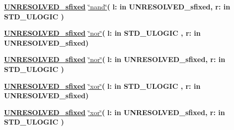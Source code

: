 \begin{DoxyCompactItemize}
\item 
{\bfseries {\bfseries {\bfseries \hyperlink{classfixed__pkg_aa723b28a027c3c0f9bca02d75e8df4d6}{U\+N\+R\+E\+S\+O\+L\+V\+E\+D\+\_\+sfixed}} \textcolor{vhdlchar}{ }}} \hyperlink{classfixed__pkg_a5aa453a7f3f95d682e4c6dad6aa12cd0}{\char`\"{}nand\char`\"{}}{\bfseries  ( }{\bfseries \textcolor{vhdlchar}{l\+: }\textcolor{stringliteral}{in }\textcolor{vhdlchar}{U\+N\+R\+E\+S\+O\+L\+V\+E\+D\+\_\+sfixed}}{\bfseries  , \textcolor{vhdlchar}{r\+: }\textcolor{stringliteral}{in }{\bfseries \textcolor{comment}{S\+T\+D\+\_\+\+U\+L\+O\+G\+I\+C}\textcolor{vhdlchar}{ }}}{\bfseries  )} 
\item 
{\bfseries {\bfseries {\bfseries \hyperlink{classfixed__pkg_aa723b28a027c3c0f9bca02d75e8df4d6}{U\+N\+R\+E\+S\+O\+L\+V\+E\+D\+\_\+sfixed}} \textcolor{vhdlchar}{ }}} \hyperlink{classfixed__pkg_a28d38e824e2ed5c03faac6db14db3aaf}{\char`\"{}nor\char`\"{}}{\bfseries  ( }{\bfseries \textcolor{vhdlchar}{l\+: }\textcolor{stringliteral}{in }{\bfseries \textcolor{comment}{S\+T\+D\+\_\+\+U\+L\+O\+G\+I\+C}\textcolor{vhdlchar}{ }}}{\bfseries  , \textcolor{vhdlchar}{r\+: }\textcolor{stringliteral}{in }\textcolor{vhdlchar}{U\+N\+R\+E\+S\+O\+L\+V\+E\+D\+\_\+sfixed}}{\bfseries  )} 
\item 
{\bfseries {\bfseries {\bfseries \hyperlink{classfixed__pkg_aa723b28a027c3c0f9bca02d75e8df4d6}{U\+N\+R\+E\+S\+O\+L\+V\+E\+D\+\_\+sfixed}} \textcolor{vhdlchar}{ }}} \hyperlink{classfixed__pkg_a28d38e824e2ed5c03faac6db14db3aaf}{\char`\"{}nor\char`\"{}}{\bfseries  ( }{\bfseries \textcolor{vhdlchar}{l\+: }\textcolor{stringliteral}{in }\textcolor{vhdlchar}{U\+N\+R\+E\+S\+O\+L\+V\+E\+D\+\_\+sfixed}}{\bfseries  , \textcolor{vhdlchar}{r\+: }\textcolor{stringliteral}{in }{\bfseries \textcolor{comment}{S\+T\+D\+\_\+\+U\+L\+O\+G\+I\+C}\textcolor{vhdlchar}{ }}}{\bfseries  )} 
\item 
{\bfseries {\bfseries {\bfseries \hyperlink{classfixed__pkg_aa723b28a027c3c0f9bca02d75e8df4d6}{U\+N\+R\+E\+S\+O\+L\+V\+E\+D\+\_\+sfixed}} \textcolor{vhdlchar}{ }}} \hyperlink{classfixed__pkg_a085837b4577e1615b7dd2445b2c2603b}{\char`\"{}xor\char`\"{}}{\bfseries  ( }{\bfseries \textcolor{vhdlchar}{l\+: }\textcolor{stringliteral}{in }{\bfseries \textcolor{comment}{S\+T\+D\+\_\+\+U\+L\+O\+G\+I\+C}\textcolor{vhdlchar}{ }}}{\bfseries  , \textcolor{vhdlchar}{r\+: }\textcolor{stringliteral}{in }\textcolor{vhdlchar}{U\+N\+R\+E\+S\+O\+L\+V\+E\+D\+\_\+sfixed}}{\bfseries  )} 
\item 
{\bfseries {\bfseries {\bfseries \hyperlink{classfixed__pkg_aa723b28a027c3c0f9bca02d75e8df4d6}{U\+N\+R\+E\+S\+O\+L\+V\+E\+D\+\_\+sfixed}} \textcolor{vhdlchar}{ }}} \hyperlink{classfixed__pkg_a085837b4577e1615b7dd2445b2c2603b}{\char`\"{}xor\char`\"{}}{\bfseries  ( }{\bfseries \textcolor{vhdlchar}{l\+: }\textcolor{stringliteral}{in }\textcolor{vhdlchar}{U\+N\+R\+E\+S\+O\+L\+V\+E\+D\+\_\+sfixed}}{\bfseries  , \textcolor{vhdlchar}{r\+: }\textcolor{stringliteral}{in }{\bfseries \textcolor{comment}{S\+T\+D\+\_\+\+U\+L\+O\+G\+I\+C}\textcolor{vhdlchar}{ }}}{\bfseries  )} 

\end{DoxyCompactItemize}
